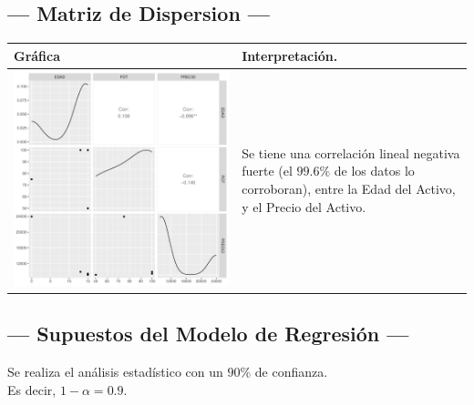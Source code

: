 \subsection{\centering --- Matriz de Dispersion ---} %
\begin{center}
  \begin{tabular}{|p{11cm}|p{5cm}|}
    \hline
    Gráfica & Interpretación. \\ \hline 
    \begin{minipage}{\textwidth}
    \includegraphics[width= 0.5 \linewidth, page=1]{../0.documentos/3_MERGED_MARKET/6_COMPRESOR_TIPO_TORNILLO/r/Rplots.pdf}
    \end{minipage} 
    &
		Se tiene una correlación lineal negativa fuerte (el \(99.6\%\) de los datos lo corroboran),
		entre la Edad del Activo, y el Precio del Activo.
		\\ \hline 
  \end{tabular}
\end{center} 

\subsection{\centering --- Supuestos del Modelo de Regresión ---} %

Se realiza el análisis estadístico con un \(90\%\) de confianza. \\ 
Es decir, \(1- \alpha = 0.9\).

